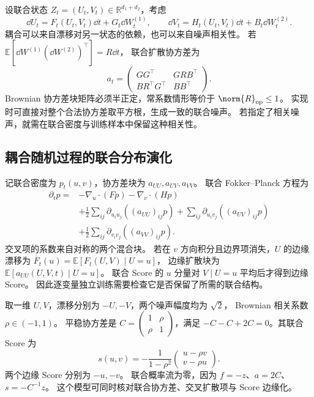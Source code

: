 设联合状态 \(Z_t=(U_t,V_t)\in\mathbb R^{d_1+d_2}\)，考虑
\[
 \dd U_t=F_t(U_t,V_t)\dd t+G_t\dd W_t^{(1)},\qquad
 \dd V_t=H_t(U_t,V_t)\dd t+B_t\dd W_t^{(2)}.
\]
耦合可以来自漂移对另一状态的依赖，也可以来自噪声相关性。
若 \(\mathbb E[\dd W^{(1)}(\dd W^{(2)})^\top]=R\dd t\)，
联合扩散协方差为
\begin{equation}
 a_t=\begin{pmatrix}GG^\top&GRB^\top\\BR^\top G^\top&BB^\top\end{pmatrix}.
 \label{eq:unified-block-diffusion}
\end{equation}
Brownian 协方差块矩阵必须半正定，常系数情形等价于 \(\norm{R}_{\mathrm{op}}\le1\)。
实现时可直接对整个合法协方差取平方根，生成一致的联合噪声。
若指定了相关噪声，就需在联合密度与训练样本中保留这种相关性。

\subsection{耦合随机过程的联合分布演化}

记联合密度为 \(p_t(u,v)\)，协方差块为 \(a_{UU},a_{UV},a_{VV}\)。
联合 Fokker--Planck 方程为
\begin{equation}
 \begin{aligned}
 \partial_t p={}&-\nabla_u\cdot(Fp)-\nabla_v\cdot(Hp)\\
 &+\tfrac12\sum_{ij}\partial_{u_i u_j}((a_{UU})_{ij}p)
 +\sum_{ij}\partial_{u_i v_j}((a_{UV})_{ij}p)\\
 &+\tfrac12\sum_{ij}\partial_{v_i v_j}((a_{VV})_{ij}p).
 \end{aligned}
 \label{eq:unified-joint-fp}
\end{equation}
交叉项的系数来自对称的两个混合块。
若在 \(v\) 方向积分且边界项消失，\(U\) 的边缘漂移为
\(\overline F_t(u)=\mathbb E[F_t(U,V)\mid U=u]\)，
边缘扩散块为 \(\mathbb E[a_{UU}(U,V,t)\mid U=u]\)。
联合 Score 的 \(u\) 分量对 \(V\mid U=u\) 平均后才得到边缘 Score。
因此逐变量独立训练需要检查它是否保留了所需的联合结构。

\begin{example}
取一维 \(U,V\)，漂移分别为 \(-U,-V\)，两个噪声幅度均为 \(\sqrt2\)，
Brownian 相关系数 \(\rho\in(-1,1)\)。
平稳协方差是 \(C=\begin{pmatrix}1&\rho\\\rho&1\end{pmatrix}\)，满足
\(-C-C+2C=0\)。其联合 Score 为
\[
 s(u,v)=-\frac1{1-\rho^2}
           \begin{pmatrix}u-\rho v\\v-\rho u\end{pmatrix}.
\]
两个边缘 Score 分别为 \(-u,-v\)。
联合概率流为零，因为 \(f=-z\)、\(a=2C\)、\(s=-C^{-1}z\)。
这个模型可同时核对联合协方差、交叉扩散项与 Score 边缘化。
\end{example}

